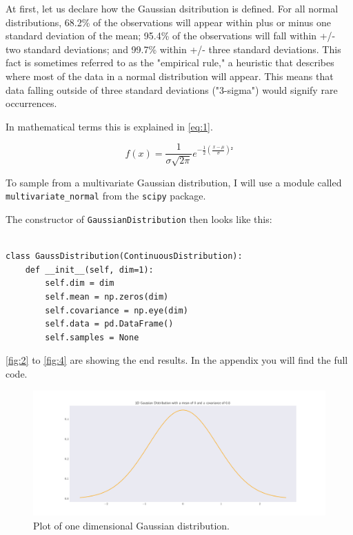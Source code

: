 \documentclass{CPSReport}
\begin{document}
At first, let us declare how the Gaussian dsitribution is defined.
For all normal distributions, 68.2\% of the observations will appear within plus or minus one standard deviation of the mean; 95.4\% of the observations will fall within +/- two standard deviations; and 99.7\% within +/- three standard deviations. This fact is sometimes referred to as the "empirical rule," a heuristic that describes where most of the data in a normal distribution will appear.
This means that data falling outside of three standard deviations ("3-sigma") would signify rare occurrences.

In mathematical terms this is explained in \autoref{eq:1}.

\begin{equation} \label{eq:1}
    f(x)=\frac{1}{\sigma \sqrt{2\pi } } e^{-\frac{1}{2}(\frac{x-\mu}{\sigma})²}
\end{equation}

To sample from a multivariate Gaussian distribution, I will use a module called \texttt{multivariate_normal} from the \texttt{scipy} package.

The constructor of \texttt{GaussianDistribution} then looks like this:

\begin{verbatim}

class GaussDistribution(ContinuousDistribution):
    def __init__(self, dim=1):
        self.dim = dim
        self.mean = np.zeros(dim)
        self.covariance = np.eye(dim)
        self.data = pd.DataFrame()
        self.samples = None
\end{verbatim}

\autoref{fig:2} to \autoref{fig:4} are showing the end results.
In the appendix you will find the full code.

\begin{figure}[ht]
    \begin{center}
        \includegraphics[width=1\linewidth]{../gaussian1D.png}
    \end{center}
    \caption{Plot of one dimensional Gaussian distribution.}
    \label{fig:2}
\end{figure}
\end{document}
